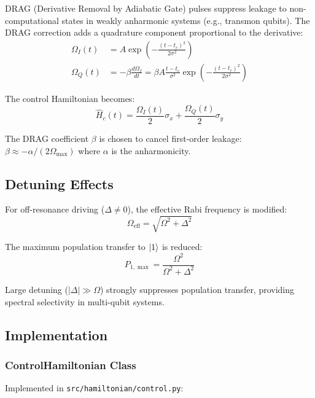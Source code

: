 \documentclass[11pt,a4paper]{article}
\theoremstyle{definition}
\theoremstyle{remark}
\begin{document}
DRAG (Derivative Removal by Adiabatic Gate) pulses suppress leakage to non-computational states in weakly anharmonic systems (e.g., transmon qubits). The DRAG correction adds a quadrature component proportional to the derivative:
\begin{align}
\Omega_I(t) &= A \exp\left(-\frac{(t - t_c)^2}{2\sigma^2}\right) \\
\Omega_Q(t) &= -\beta \frac{d\Omega_I}{dt} = \beta A \frac{t - t_c}{\sigma^2} \exp\left(-\frac{(t - t_c)^2}{2\sigma^2}\right)
\end{align}

The control Hamiltonian becomes:
\begin{equation}
\hat{H}_c(t) = \frac{\Omega_I(t)}{2} \sigma_x + \frac{\Omega_Q(t)}{2} \sigma_y
\end{equation}

The DRAG coefficient $\beta$ is chosen to cancel first-order leakage: $\beta \approx -\alpha / (2\Omega_{\max})$ where $\alpha$ is the anharmonicity.

\subsection{Detuning Effects}

For off-resonance driving ($\Delta \neq 0$), the effective Rabi frequency is modified:
\begin{equation}
\Omega_{\text{eff}} = \sqrt{\Omega^2 + \Delta^2}
\end{equation}

The maximum population transfer to $\ket{1}$ is reduced:
\begin{equation}
P_{1,\max} = \frac{\Omega^2}{\Omega^2 + \Delta^2}
\end{equation}

Large detuning ($|\Delta| \gg \Omega$) strongly suppresses population transfer, providing spectral selectivity in multi-qubit systems.

\subsection{Implementation}

\subsubsection{ControlHamiltonian Class}

Implemented in \texttt{src/hamiltonian/control.py}:
\end{document}
